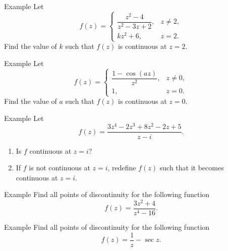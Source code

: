\documentclass[11pt]{beamer}
\theoremstyle{plain}
\begin{document}
\begin{frame}{Example}
Let
\[
f(z)=
\begin{cases}
\dfrac{z^2-4}{z^2-3z+2}, & z\neq 2,\\[6pt]
kz^2+6, & z=2.
\end{cases}
\]
Find the value of $k$ such that $f(z)$ is continuous at $z=2$.
\end{frame}

\begin{frame}{Example}
Let
\[
f(z)=
\begin{cases}
\dfrac{1-\cos(az)}{z^2}, & z\neq 0,\\[6pt]
1, & z=0.
\end{cases}
\]
Find the value of $a$ such that $f(z)$ is continuous at $z=0$.
\end{frame}

\begin{frame}{Example}
Let
\[
f(z)=\frac{3z^4-2z^3+8z^2-2z+5}{z-i}.
\]
\begin{enumerate}
  \item Is $f$ continuous at $z=i$?
  \item If $f$ is not continuous at $z=i$, redefine $f(z)$ such that it becomes
  continuous at $z=i$.
\end{enumerate}   
\end{frame}

\begin{frame}{Example}
Find all points of discontinuity for the following function
\[
f(z)=\frac{3z^2+4}{z^4-16}.
\]
\end{frame}

\begin{frame}{Example}
Find all points of discontinuity for the following function
\[
f(z)=\frac{1}{z}-\sec{z}.
\]
\end{frame}
\end{document}
